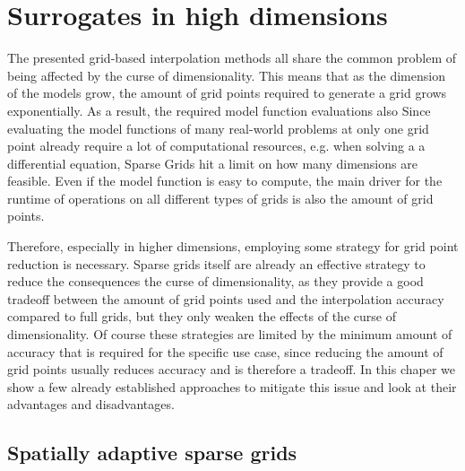 \documentclass[
  a4paper,  %
  twoside,  %
  bibliography=totoc,
  headsepline,
  cleardoublepage=empty,
  parskip=half,
  draft=false
]{scrbook}
\begin{document}
\chapter{Surrogates in high dimensions}

The presented grid-based interpolation methods all share the common problem of being affected by the curse of dimensionality.
This means that as the dimension of the models grow, the amount of grid points required to generate a grid grows exponentially.
As a result, the required model function evaluations also
Since evaluating the model functions of many real-world problems at only one grid point already require a lot of computational resources, e.g. when solving a a differential equation, Sparse Grids hit a limit on how many dimensions are feasible.
Even if the model function is easy to compute, the main driver for the runtime of operations on all different types of grids is also the amount of grid points.

Therefore, especially in higher dimensions, employing some strategy for grid point reduction is necessary.
Sparse grids itself are already an effective strategy to reduce the consequences the curse of dimensionality, as they provide a good tradeoff between the amount of grid points used and the interpolation accuracy compared to full grids, but they only weaken the effects of the curse of dimensionality.
Of course these strategies are limited by the minimum amount of accuracy that is required for the specific use case, since reducing the amount of grid points usually reduces accuracy and is therefore a tradeoff.
In this chaper we show a few already established approaches to mitigate this issue and look at their advantages and disadvantages.

\section{Spatially adaptive sparse grids}
\end{document}
